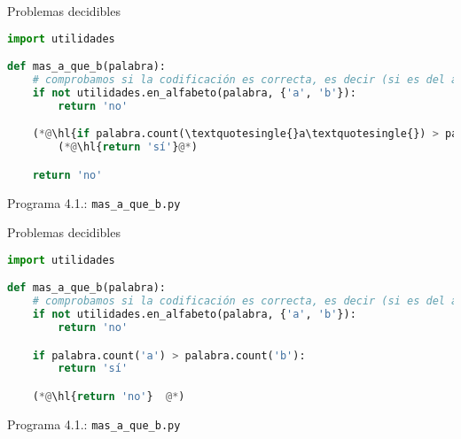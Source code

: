 \documentclass[10pt,xcolor=dvipsnames,aspectratio=169,spanish]{beamer}
\makeatletter
\let\HL\hl
\renewcommand\hl{%
  \let\set@color\beamerorig@set@color
  \let\reset@color\beamerorig@reset@color
  \HL}
\makeatother
\begin{document}

\begin{frame}[fragile]{Problemas decidibles}

\begin{lstlisting}[language=Python]
import utilidades

def mas_a_que_b(palabra):
    # comprobamos si la codificación es correcta, es decir (si es del alfabeto {'a', 'b'}), si no es correcta devolvemos 'no'
    if not utilidades.en_alfabeto(palabra, {'a', 'b'}):
        return 'no'

    (*@\hl{if palabra.count(\textquotesingle{}a\textquotesingle{}) > palabra.count(\textquotesingle{}b\textquotesingle{}): }@*)
        (*@\hl{return 'sí'}@*)

    return 'no'
\end{lstlisting}
\vspace*{-4mm}
\begin{center}
{\small Programa 4.1.: \texttt{mas\_a\_que\_b.py}}
\end{center}

\end{frame}



\begin{frame}[fragile]{Problemas decidibles}

\begin{lstlisting}[language=Python]
import utilidades

def mas_a_que_b(palabra):
    # comprobamos si la codificación es correcta, es decir (si es del alfabeto {'a', 'b'}), si no es correcta devolvemos 'no'
    if not utilidades.en_alfabeto(palabra, {'a', 'b'}):
        return 'no'

    if palabra.count('a') > palabra.count('b'):
        return 'sí'

    (*@\hl{return 'no'}  @*)
\end{lstlisting}
\vspace*{-4mm}
\begin{center}
{\small Programa 4.1.: \texttt{mas\_a\_que\_b.py}}
\end{center}

\end{frame}

\end{document}
